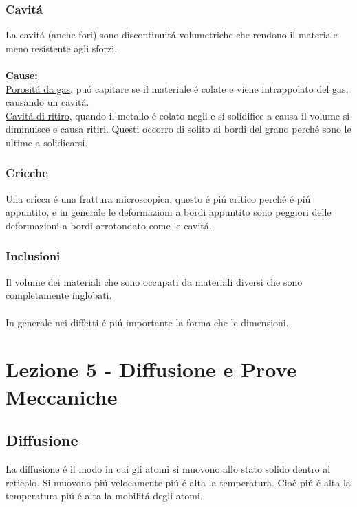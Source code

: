 \documentclass{article}
\begin{document}
            \subsubsection{Cavit\'a}
                La cavit\'a (anche fori) sono discontinuit\'a volumetriche che rendono il materiale meno resistente agli sforzi.\\ \\
                \underline{\textbf{Cause:}} \\
                \underline{Porosit\'a da gas}, pu\'o capitare se il materiale \'e colate e viene intrappolato del gas, causando un cavit\'a.\\
                \underline{Cavit\'a di ritiro}, quando il metallo \'e colato negli e si solidifice a causa il volume si diminuisce e causa ritiri. Questi occorro di solito ai bordi del grano perch\'e sono le ultime a solidicarsi.
            \subsubsection{Cricche}
                Una cricca \'e una frattura microscopica, questo \'e pi\'u critico perch\'e \'e pi\'u appuntito, e in generale le deformazioni a bordi appuntito sono peggiori delle deformazioni a bordi arrotondato come le cavit\'a.
            \subsubsection{Inclusioni}
                Il volume dei materiali che sono occupati da materiali diversi che sono completamente inglobati. \\ \\
            In generale nei diffetti \'e pi\'u importante la forma che le dimensioni.
    \section{Lezione 5 - Diffusione e Prove Meccaniche}
        \subsection{Diffusione}
            La diffusione \'e il modo in cui gli atomi si muovono allo stato solido dentro al reticolo. Si muovono pi\'u velocamente pi\'u \'e alta la temperatura. Cio\'e pi\'u \'e alta la temperatura pi\'u \'e alta la mobilit\'a degli atomi.
\end{document}
